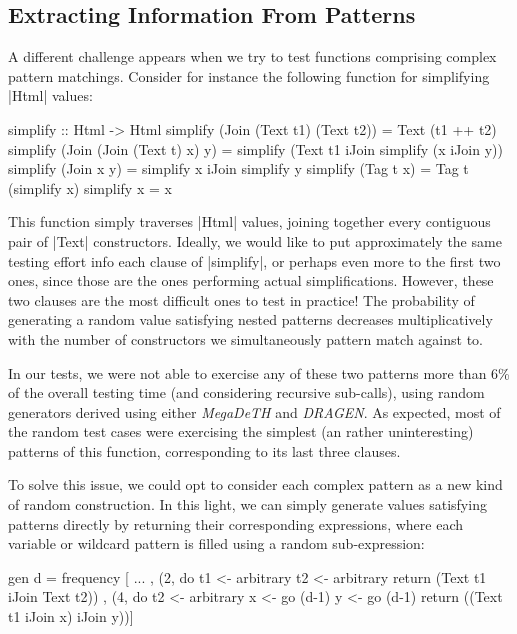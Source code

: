 %
\subsection{Extracting Information From Patterns}

A different challenge appears when we try to test functions comprising complex
pattern matchings. Consider for instance the following function for simplifying
|Html| values:

\begin{code}
simplify :: Html -> Html
simplify (Join (Text t1) (Text t2)) = Text (t1 ++ t2)
simplify (Join (Join (Text t) x) y)
  = simplify (Text t1 iJoin simplify (x iJoin y))
simplify (Join x y) = simplify x iJoin simplify y
simplify (Tag t x) = Tag t (simplify x)
simplify x = x
\end{code}
%
This function simply traverses |Html| values, joining together every contiguous
pair of |Text| constructors.
%
Ideally, we would like to put approximately the same testing effort info each
clause of |simplify|, or perhaps even more to the first two ones, since those
are the ones performing actual simplifications.
%
However, these two clauses are the most difficult ones to test in practice!
%
The probability of generating a random value satisfying nested patterns
decreases multiplicatively with the number of constructors we simultaneously
pattern match against to.


In our tests, we were not able to exercise any of these two patterns more than
6\% of the overall testing time (and considering recursive sub-calls), using
random generators derived using either \emph{MegaDeTH} and \emph{DRAGEN}.
%
As expected, most of the random test cases were exercising the simplest (an
rather uninteresting) patterns of this function, corresponding to its last three
clauses.


To solve this issue, we could opt to consider each complex pattern as a new kind
of random construction.
%
In this light, we can simply generate values satisfying patterns directly by
returning their corresponding expressions, where each variable or wildcard
pattern is filled using a random sub-expression:

\begin{code}
  gen d = frequency
    [ ...
    , (2, do  t1  <- arbitrary
              t2  <- arbitrary
              return (Text t1 iJoin Text t2))
    , (4, do  t2  <- arbitrary
              x   <- go (d-1)
              y   <- go (d-1)
              return ((Text t1 iJoin x) iJoin y))]
\end{code}%


